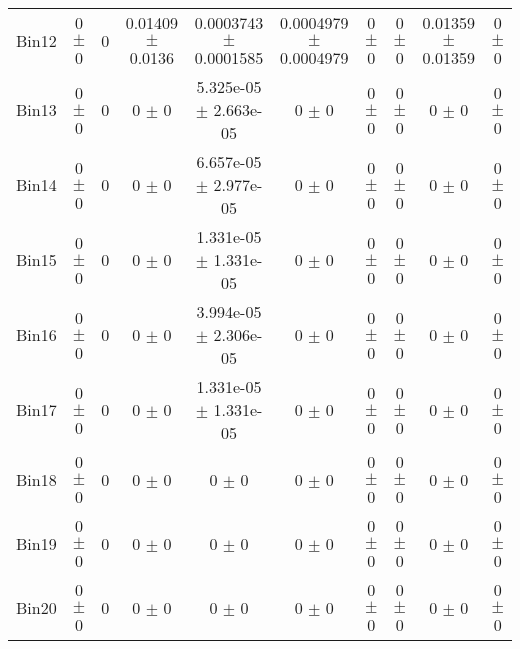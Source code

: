 \begin{tabular}{@{\extracolsep{4pt}}lccccccccc@{}}
     Bin12 & 0 $\pm$ 0 & 0 & 0.01409 $\pm$ 0.0136 & 0.0003743 $\pm$ 0.0001585 & 0.0004979 $\pm$ 0.0004979 & 0 $\pm$ 0 & 0 $\pm$ 0 & 0.01359 $\pm$ 0.01359 & 0 $\pm$ 0 \\ 
     Bin13 & 0 $\pm$ 0 & 0 & 0 $\pm$ 0 & 5.325e-05 $\pm$ 2.663e-05 & 0 $\pm$ 0 & 0 $\pm$ 0 & 0 $\pm$ 0 & 0 $\pm$ 0 & 0 $\pm$ 0 \\ 
     Bin14 & 0 $\pm$ 0 & 0 & 0 $\pm$ 0 & 6.657e-05 $\pm$ 2.977e-05 & 0 $\pm$ 0 & 0 $\pm$ 0 & 0 $\pm$ 0 & 0 $\pm$ 0 & 0 $\pm$ 0 \\ 
     Bin15 & 0 $\pm$ 0 & 0 & 0 $\pm$ 0 & 1.331e-05 $\pm$ 1.331e-05 & 0 $\pm$ 0 & 0 $\pm$ 0 & 0 $\pm$ 0 & 0 $\pm$ 0 & 0 $\pm$ 0 \\ 
     Bin16 & 0 $\pm$ 0 & 0 & 0 $\pm$ 0 & 3.994e-05 $\pm$ 2.306e-05 & 0 $\pm$ 0 & 0 $\pm$ 0 & 0 $\pm$ 0 & 0 $\pm$ 0 & 0 $\pm$ 0 \\ 
     Bin17 & 0 $\pm$ 0 & 0 & 0 $\pm$ 0 & 1.331e-05 $\pm$ 1.331e-05 & 0 $\pm$ 0 & 0 $\pm$ 0 & 0 $\pm$ 0 & 0 $\pm$ 0 & 0 $\pm$ 0 \\ 
     Bin18 & 0 $\pm$ 0 & 0 & 0 $\pm$ 0 & 0 $\pm$ 0 & 0 $\pm$ 0 & 0 $\pm$ 0 & 0 $\pm$ 0 & 0 $\pm$ 0 & 0 $\pm$ 0 \\ 
     Bin19 & 0 $\pm$ 0 & 0 & 0 $\pm$ 0 & 0 $\pm$ 0 & 0 $\pm$ 0 & 0 $\pm$ 0 & 0 $\pm$ 0 & 0 $\pm$ 0 & 0 $\pm$ 0 \\ 
     Bin20 & 0 $\pm$ 0 & 0 & 0 $\pm$ 0 & 0 $\pm$ 0 & 0 $\pm$ 0 & 0 $\pm$ 0 & 0 $\pm$ 0 & 0 $\pm$ 0 & 0 $\pm$ 0 \\ 
\hline\hline
  \end{tabular}
